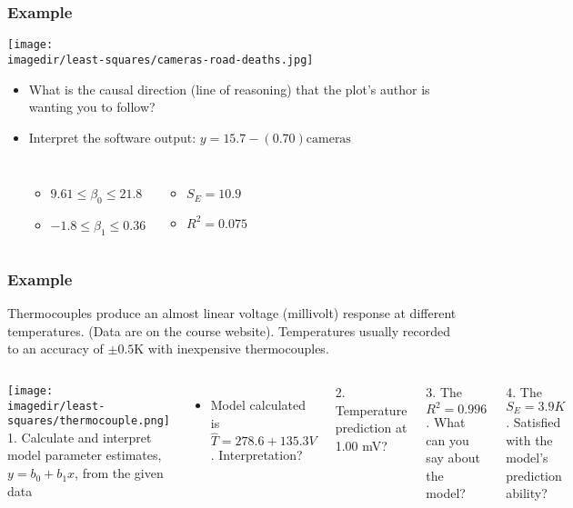 \begin{frame}\frametitle{Example}
	\begin{center}
		\texttt{[image: \\imagedir/least-squares/cameras-road-deaths.jpg]}
	\end{center}
	\vspace{-8pt}
	\begin{itemize}
		\item	What is the causal direction (line of reasoning) that the plot's author is wanting you to follow?
		\item	Interpret the software output: $y = 15.7 - (0.70) \text{cameras}$
		\vspace{-16pt}
		\begin{columns}[t]
				\begin{itemize}
					\item	$9.61 \leq \beta_0 \leq 21.8$
					\item	$-1.8 \leq \beta_1 \leq 0.36$
				\end{itemize}
				\begin{itemize}
					\item	$S_E = 10.9$
					\item	$R^2 = 0.075$
				\end{itemize}
		\end{columns}
		
	\end{itemize}
\end{frame}

\begin{frame}\frametitle{Example}

	Thermocouples produce an almost linear voltage (millivolt) response at different temperatures. (Data are on the course website). Temperatures usually recorded to an accuracy of $\pm 0.5$K with inexpensive thermocouples.
	\begin{columns}
		\column{5cm}
		\texttt{[image: \\imagedir/least-squares/thermocouple.png]} \column{5cm} 1. Calculate and interpret model parameter estimates, $y = b_0 + b_1 x$, from the given data
		\begin{itemize}
			\item	Model calculated is $\hat{T} = 278.6 + 135.3 V$. Interpretation?
		\end{itemize}

		2. Temperature prediction at 1.00 mV?

		3. The $R^2 = 0.996$. What can you say about the model?

		4. The $S_E = 3.9K$. Satisfied with the model's prediction ability?
	\end{columns}
\end{frame}

